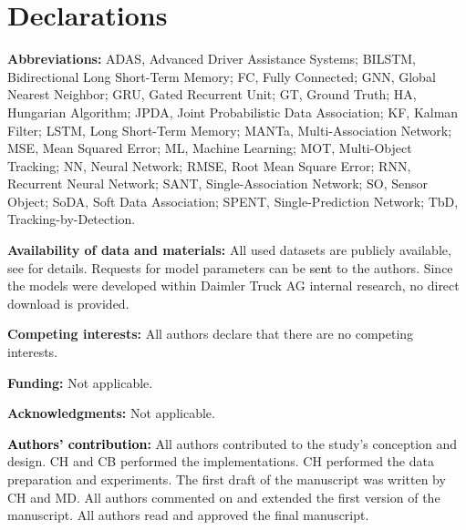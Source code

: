 \documentclass[letterpaper, 10 pt, journal, twoside]{IEEEtran}
\newcommand{\red}[1]{\textcolor{black}{#1}}
\begin{document}
\section*{Declarations}
\small{
\noindent
\textbf{Abbreviations:} ADAS, Advanced Driver Assistance Systems; BILSTM, Bidirectional Long Short-Term Memory; FC, Fully Connected; GNN, Global Nearest Neighbor; GRU, Gated Recurrent Unit; GT, Ground Truth; HA, Hungarian Algorithm; JPDA, Joint Probabilistic Data Association; KF, Kalman Filter; LSTM, Long Short-Term Memory; MANTa, Multi-Association Network; MSE, Mean Squared Error; ML, Machine Learning; MOT, Multi-Object Tracking; NN, Neural Network; RMSE, Root Mean Square Error; RNN, Recurrent Neural Network; SANT, Single-Association Network; SO, Sensor Object; SoDA, Soft Data Association; SPENT, Single-Prediction Network; TbD, Tracking-by-Detection.

\noindent
	\textbf{Availability of data and materials:} All used datasets are publicly available, see {\cite{Geiger2012CVPR}} for details. Requests for model parameters can be \red{sent} to the authors. Since the models were developed within Daimler Truck AG internal research, no direct download is provided.

\noindent
\textbf{Competing interests:} All authors declare that there are no competing interests.

\noindent
\textbf{Funding:} Not applicable.

\noindent
\textbf{Acknowledgments:} Not applicable.

\noindent
	\textbf{\red{Authors' contribution}:} All authors contributed to the study’s conception and design. CH and CB performed the implementations. CH performed the data preparation and experiments. The first draft of the manuscript was written by CH and MD. All authors commented on and extended the first version of the manuscript. All authors read and approved the final manuscript.
}




\vfill
\end{document}
